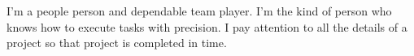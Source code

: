 \documentclass[9pt]{developercv} %
\begin{document}
\vspace{0.5cm}



\begin{minipage}[t]{0.4\textwidth} %
	\vspace{-\baselineskip} %
	
	I'm a people person and dependable team player. I'm the kind of person who knows how to execute tasks with precision. I pay attention to all the details of a project so that project is completed in time. 
\end{minipage}
\hfill %
\begin{minipage}[t]{0.5\textwidth} %
	\vspace{-\baselineskip} %
	\begin{barchart}{5.5}
	\end{barchart}
\end{minipage}

\begin{center}
\end{center}


\end{document}
